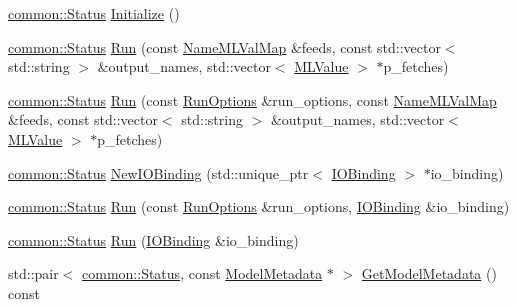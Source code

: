 \begin{DoxyCompactItemize}
\item 
\mbox{\hyperlink{classonnxruntime_1_1common_1_1Status}{common\+::\+Status}} \mbox{\hyperlink{classonnxruntime_1_1InferenceSession_aef2b179e956c7450ccf22d0be3374b6e}{Initialize}} ()
\item 
\mbox{\hyperlink{classonnxruntime_1_1common_1_1Status}{common\+::\+Status}} \mbox{\hyperlink{classonnxruntime_1_1InferenceSession_a90aa8b5fdc2638c4d2c45afc9c3ed222}{Run}} (const \mbox{\hyperlink{namespaceonnxruntime_a48b01f0410ec8d693dbd40d1132bd66c}{Name\+M\+L\+Val\+Map}} \&feeds, const std\+::vector$<$ std\+::string $>$ \&output\+\_\+names, std\+::vector$<$ \mbox{\hyperlink{classonnxruntime_1_1MLValue}{M\+L\+Value}} $>$ $\ast$p\+\_\+fetches)
\item 
\mbox{\hyperlink{classonnxruntime_1_1common_1_1Status}{common\+::\+Status}} \mbox{\hyperlink{classonnxruntime_1_1InferenceSession_ad15921c8bc265da60685fd1c20ba3b62}{Run}} (const \mbox{\hyperlink{namespaceonnxruntime_a28ccb3d97f6827bf04d2ce259ff968f1}{Run\+Options}} \&run\+\_\+options, const \mbox{\hyperlink{namespaceonnxruntime_a48b01f0410ec8d693dbd40d1132bd66c}{Name\+M\+L\+Val\+Map}} \&feeds, const std\+::vector$<$ std\+::string $>$ \&output\+\_\+names, std\+::vector$<$ \mbox{\hyperlink{classonnxruntime_1_1MLValue}{M\+L\+Value}} $>$ $\ast$p\+\_\+fetches)
\item 
\mbox{\hyperlink{classonnxruntime_1_1common_1_1Status}{common\+::\+Status}} \mbox{\hyperlink{classonnxruntime_1_1InferenceSession_a1cdd5e4a373360fc01377678ad059822}{New\+I\+O\+Binding}} (std\+::unique\+\_\+ptr$<$ \mbox{\hyperlink{classonnxruntime_1_1IOBinding}{I\+O\+Binding}} $>$ $\ast$io\+\_\+binding)
\item 
\mbox{\hyperlink{classonnxruntime_1_1common_1_1Status}{common\+::\+Status}} \mbox{\hyperlink{classonnxruntime_1_1InferenceSession_aabfd4a072935636d0e9f975f015a7c47}{Run}} (const \mbox{\hyperlink{namespaceonnxruntime_a28ccb3d97f6827bf04d2ce259ff968f1}{Run\+Options}} \&run\+\_\+options, \mbox{\hyperlink{classonnxruntime_1_1IOBinding}{I\+O\+Binding}} \&io\+\_\+binding)
\item 
\mbox{\hyperlink{classonnxruntime_1_1common_1_1Status}{common\+::\+Status}} \mbox{\hyperlink{classonnxruntime_1_1InferenceSession_a368fe68929fde82474199bfe581e24ce}{Run}} (\mbox{\hyperlink{classonnxruntime_1_1IOBinding}{I\+O\+Binding}} \&io\+\_\+binding)
\item 
std\+::pair$<$ \mbox{\hyperlink{classonnxruntime_1_1common_1_1Status}{common\+::\+Status}}, const \mbox{\hyperlink{structonnxruntime_1_1ModelMetadata}{Model\+Metadata}} $\ast$ $>$ \mbox{\hyperlink{classonnxruntime_1_1InferenceSession_a1ef429e9018e8bc9989c0f0c59330c87}{Get\+Model\+Metadata}} () const

\end{DoxyCompactItemize}
